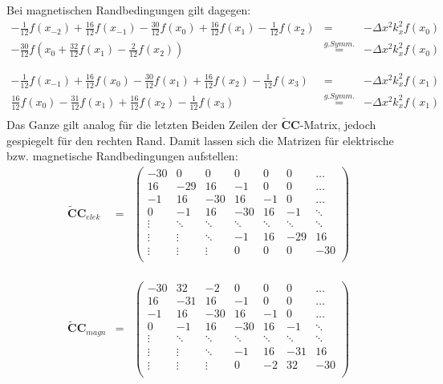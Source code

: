 \documentclass[Protokollheft.tex]{subfiles}
\begin{document}
	Bei magnetischen Randbedingungen gilt dagegen:
	\begin{eqnarray*}
		-\frac{1}{12}f(x_{-2})+\frac{16}{12}f(x_{-1})-\frac{30}{12}f(x_0)+\frac{16}{12}f(x_{1})-\frac{1}{12}f(x_{2})&=&-\Delta x^2k^2_xf(x_0)\\
		-\frac{30}{12}f(x_0+\frac{32}{12}f(x_{1})-\frac{2}{12}f(x_{2}))&\stackrel{g. Symm.}{=}&-\Delta x^2k^2_xf(x_0)\\
		\\
		\\
		-\frac{1}{12}f(x_{-1})+\frac{16}{12}f(x_{0})-\frac{30}{12}f(x_1)+\frac{16}{12}f(x_{2})-\frac{1}{12}f(x_{3})&=&-\Delta x^2k^2_xf(x_1)\\
		\frac{16}{12}f(x_{0})-\frac{31}{12}f(x_1)+\frac{16}{12}f(x_{2})-\frac{1}{12}f(x_{3})&\stackrel{g. Symm.}{=}&-\Delta x^2k^2_xf(x_1)\\
	\end{eqnarray*}
	Das Ganze gilt analog für die letzten Beiden Zeilen der $\mathbf{\widetilde{C}C}$-Matrix, jedoch gespiegelt für den rechten Rand.
	Damit lassen sich die Matrizen für elektrische bzw. magnetische Randbedingungen aufstellen:
	\begin{eqnarray*}
		\mathbf{\widetilde{C}C}_{elek}&=&\begin{pmatrix} -30 & 0 & 0 & 0 & 0 & 0 & \dots \\ 
			16 & -29 & 16 & -1 & 0 & 0 & \dots\\ 
			-1 & 16 & -30 & 16 & -1 & 0 & \dots\\ 
			0 & -1 & 16 & -30 & 16 & -1 & \ddots\\ 
			\vdots & \ddots & \ddots & \ddots & \ddots & \ddots & \ddots\\
			\vdots & \vdots & \ddots & -1 & 16 & -29 & 16\\
			\vdots & \vdots & \vdots & 0 & 0 & 0 & -30\\
		\end{pmatrix}
		\\
		\\
		\\
		\\
		\mathbf{\widetilde{C}C}_{magn}&=&\begin{pmatrix} -30 & 32 & -2 & 0 & 0 & 0 & \dots \\ 
			16 & -31 & 16 & -1 & 0 & 0 & \dots\\ 
			-1 & 16 & -30 & 16 & -1 & 0 & \dots\\ 
			0 & -1 & 16 & -30 & 16 & -1 & \ddots\\ 
			\vdots & \ddots & \ddots & \ddots & \ddots & \ddots & \ddots\\
			\vdots & \vdots & \ddots & -1 & 16 & -31 & 16\\
			\vdots & \vdots & \vdots & 0 & -2 & 32 & -30\\
		\end{pmatrix}
	\end{eqnarray*}
	
\end{document}
